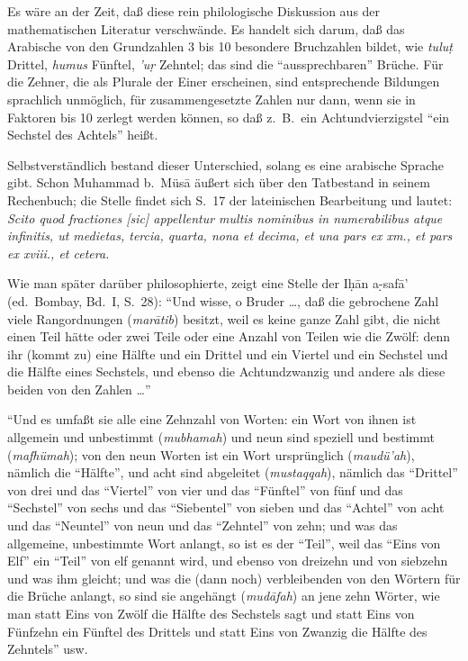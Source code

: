 \documentclass[11pt,a4paper]{article}
\newcommand{\s}[1]{\d{#1}}     %
\newcommand{\hw}{\d{h}}       %
\newcommand{\enquote}[1]{``#1''}
\begin{document}
Es w\"are an der Zeit, da\ss{} diese rein philologische Diskussion aus der mathematischen Literatur verschw\"ande. Es handelt sich darum, da\ss{} das Arabische von den Grundzahlen 3 bis 10 besondere Bruchzahlen bildet, wie \textit{tulu\d{t}} Drittel, \textit{humus} F\"unftel, \textit{'u\s{r}} Zehntel; das sind die \enquote{aussprechbaren} Br\"uche. F\"ur die Zehner, die als Plurale der Einer erscheinen, sind entsprechende Bildungen sprachlich unm\"oglich, f\"ur zusammengesetzte Zahlen nur dann, wenn sie in Faktoren bis 10 zerlegt werden k\"onnen, so da\ss{} z.\ B.\ ein Achtundvierzigstel \enquote{ein Sechstel des Achtels} hei\ss{}t.

Selbstverst\"andlich bestand dieser Unterschied, solang es eine arabische Sprache gibt. Schon Muhammad b.\ M\"us\=a \"au\ss{}ert sich \"uber den Tatbestand in seinem Rechenbuch; die Stelle findet sich S.\ 17 der lateinischen Bearbeitung und lautet: \textit{Scito quod fractiones [sic] appellentur multis nominibus in numerabilibus atque infinitis, ut medietas, tercia, quarta, nona et decima, et una pars ex xm., et pars ex xviii., et cetera.}

Wie man sp\"ater dar\"uber philosophierte, zeigt eine Stelle der I\hw{}\=an a\s-s{}af\=a' (ed.\ Bombay, Bd.\ I, S.\ 28): \enquote{Und wisse, o Bruder \ldots{}, da\ss{} die gebrochene Zahl viele Rangordnungen (\textit{mar\=atib}) besitzt, weil es keine ganze Zahl gibt, die nicht einen Teil h\"atte oder zwei Teile oder eine Anzahl von Teilen wie die Zw\"olf: denn ihr (kommt zu) eine H\"alfte und ein Drittel und ein Viertel und ein Sechstel und die H\"alfte eines Sechstels, und ebenso die Achtundzwanzig und andere als diese beiden von den Zahlen \ldots{}}

\enquote{Und es umfa\ss{}t sie alle eine Zehnzahl von Worten: ein Wort von ihnen ist allgemein und unbestimmt (\textit{mubhamah}) und neun sind speziell und bestimmt (\textit{mafh\"umah}); von den neun Worten ist ein Wort urspr\"unglich (\textit{maud\"u'ah}), n\"amlich die \enquote{H\"alfte}, und acht sind abgeleitet (\textit{mustaqqah}), n\"amlich das \enquote{Drittel} von drei und das \enquote{Viertel} von vier und das \enquote{F\"unftel} von f\"unf und das \enquote{Sechstel} von sechs und das \enquote{Siebentel} von sieben und das \enquote{Achtel} von acht und das \enquote{Neuntel} von neun und das \enquote{Zehntel} von zehn; und was das allgemeine, unbestimmte Wort anlangt, so ist es der \enquote{Teil}, weil das \enquote{Eins von Elf} ein \enquote{Teil} von elf genannt wird, und ebenso von dreizehn und von siebzehn und was ihm gleicht; und was die (dann noch) verbleibenden von den W\"ortern f\"ur die Br\"uche anlangt, so sind sie angeh\"angt (\textit{mud\=afah}) an jene zehn W\"orter, wie man statt Eins von Zw\"olf die H\"alfte des Sechstels sagt und statt Eins von F\"unfzehn ein F\"unftel des Drittels und statt Eins von Zwanzig die H\"alfte des Zehntels} usw.
\end{document}

